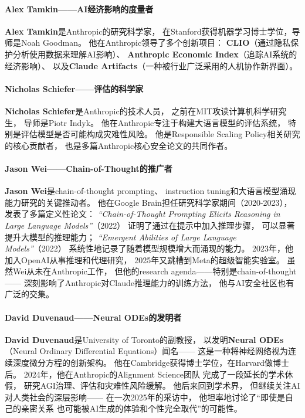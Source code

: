 \paragraph{Alex Tamkin——AI经济影响的度量者}
\textbf{Alex Tamkin}是Anthropic的研究科学家，
在Stanford获得机器学习博士学位，导师是Noah Goodman。
他在Anthropic领导了多个创新项目：
\textbf{CLIO}（通过隐私保护分析使用数据来理解AI影响）、
\textbf{Anthropic Economic Index}（追踪AI系统的经济影响）、
以及\textbf{Claude Artifacts}（一种被行业广泛采用的人机协作新界面）。

\paragraph{Nicholas Schiefer——评估的科学家}
\textbf{Nicholas Schiefer}是Anthropic的技术人员，
之前在MIT攻读计算机科学研究生，
导师是Piotr Indyk。
他在Anthropic专注于构建大语言模型的评估系统，
特别是评估模型是否可能构成灾难性风险。
他是Responsible Scaling Policy相关研究的核心贡献者，
也是多篇Anthropic核心安全论文的共同作者。

\paragraph{Jason Wei——Chain-of-Thought的推广者}
\textbf{Jason Wei}是chain-of-thought prompting、
instruction tuning和大语言模型涌现能力研究的关键推动者。
他在Google Brain担任研究科学家期间（2020-2023），
发表了多篇定义性论文：
\textit{``Chain-of-Thought Prompting Elicits Reasoning
in Large Language Models''}（2022）
证明了通过在提示中加入推理步骤，
可以显著提升大模型的推理能力；
\textit{``Emergent Abilities of Large Language Models''}（2022）
系统性地记录了随着模型规模增大而涌现的能力。
2023年，他加入OpenAI从事推理和代理研究，
2025年又跳槽到Meta的超级智能实验室。
虽然Wei从未在Anthropic工作，
但他的research agenda——特别是chain-of-thought——
深刻影响了Anthropic对Claude推理能力的训练方法，
他与AI安全社区也有广泛的交集。

\paragraph{David Duvenaud——Neural ODEs的发明者}
\textbf{David Duvenaud}是University of Toronto的副教授，
以发明\textbf{Neural ODEs}
（Neural Ordinary Differential Equations）闻名——
这是一种将神经网络视为连续深度微分方程的创新架构。
他在Cambridge获得博士学位，在Harvard做博士后。
2024年，他在Anthropic的Alignment Science团队
完成了一段延长的学术休假，
研究AGI治理、评估和灾难性风险缓解。
他后来回到学术界，
但继续关注AI对人类社会的深层影响——
在一次2025年的采访中，
他坦率地讨论了``即使是自己的亲密关系
也可能被AI生成的体验和个性完全取代''的可能性。


